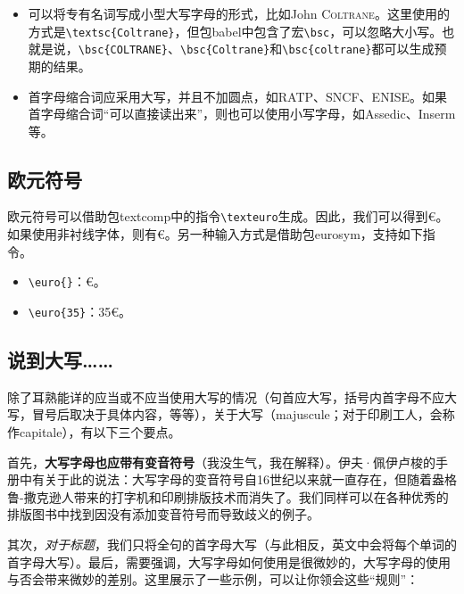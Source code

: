 \begin{itemize}
    \item 可以将专有名词写成小型大写字母的形式，比如John \textsc{Coltrane}。这里使用的方式是\linebreak\verb|\textsc{Coltrane}|，但包\textsf{babel}中包含了宏\verb|\bsc|，可以忽略大小写。也就是说，\verb|\bsc{COLTRANE}|、\linebreak\verb|\bsc{Coltrane}|和\verb|\bsc{coltrane}|都可以生成预期的结果。
    
    \item 首字母缩合词应采用大写，并且不加圆点，如RATP、SNCF、ENISE。如果首字母缩合词“可以直接读出来”，则也可以使用小写字母，如Assedic、Inserm等。
\end{itemize}

\subsection{欧元符号}

欧元符号可以借助包\textsf{textcomp}中的指令\verb|\texteuro|生成。因此，我们可以得到€。如果使用非衬线字体，则有\textsf{€}。另一种输入方式是借助包\textsf{eurosym}，支持如下指令。

\begin{itemize}
    \item \verb|\euro{}|：€。
    \item \verb|\euro{35}|：35€。
\end{itemize}

\subsection{说到大写……}

除了耳熟能详的应当或不应当使用大写的情况（句首应大写，括号内首字母不应大写，冒号后取决于具体内容，等等），关于大写（majuscule；对于印刷工人，会称作capitale），有以下三个要点。

首先，\textbf{大写字母也应带有变音符号}（我没生气，我在解释）。伊夫·佩伊卢梭的手册中有关于此的说法：大写字母的变音符号自16世纪以来就一直存在，但随着盎格鲁-撒克逊人带来的打字机和印刷排版技术而消失了。我们同样可以在各种优秀的排版图书中找到因没有添加变音符号而导致歧义的例子。

其次，\emph{对于标题}，我们只将全句的首字母大写（与此相反，英文中会将每个单词的首字母大写）。最后，需要强调，大写字母如何使用是很微妙的，大写字母的使用与否会带来微妙的差别。这里展示了一些示例，可以让你领会这些“规则”：

